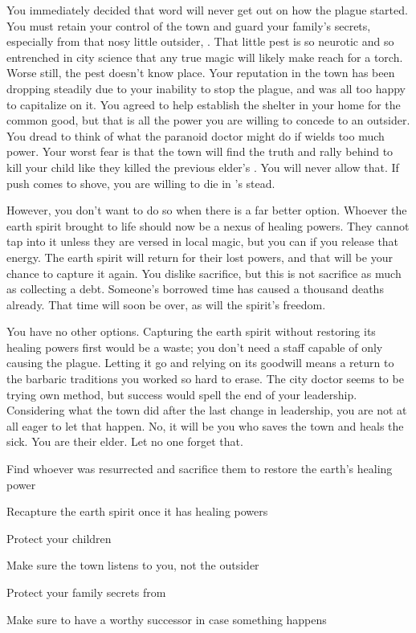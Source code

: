 \documentclass[char]{guildcamp4}
\begin{document}
You immediately decided that word will never get out on how the plague started. You must retain your control of the town and guard your family's secrets, especially from that nosy little outsider, \cOutsider{}. That little pest is so neurotic and so entrenched in \cOutsider{\their} city science that any true magic will likely make \cOutsider{\them} reach for a torch. Worse still, the pest doesn't know \cOutsider{\their} place. Your reputation in the town has been dropping steadily due to your inability to stop the plague, and \cOutsider{} was all too happy to capitalize on it. You agreed to help \cOutsider{\them} establish the shelter in your home for the common good, but that is all the power you are willing to concede to an outsider. You dread to think of what the paranoid doctor might do if \cOutsider{\they} wields too much power. Your worst fear is that the town will find the truth and rally behind \cOutsider{\them} to kill your child like they killed the previous elder's \cPlaguebearer{\offspring}. You will never allow that. If push comes to shove, you are willing to die in \cRebel{}'s stead. 

However, you don't want to do so when there is a far better option. Whoever the earth spirit brought to life should now be a nexus of healing powers. They cannot tap into it unless they are versed in local magic, but you can if you release that energy. The earth spirit will return for their lost powers, and that will be your chance to capture it again. You dislike sacrifice, but this is not sacrifice as much as collecting a debt. Someone's borrowed time has caused a thousand deaths already. That time will soon be over, as will the spirit's freedom. 

You have no other options. Capturing the earth spirit without restoring its healing powers first would be a waste; you don't need a staff capable of only causing the plague. Letting it go and relying on its goodwill means a return to the barbaric traditions you worked so hard to erase. The city doctor seems to be trying \cOutsider{\their} own method, but \cOutsider{\their} success would spell the end of your leadership. Considering what the town did after the last change in leadership, you are not at all eager to let that happen. No, it will be you who saves the town and heals the sick. You are their elder. Let no one forget that.

\begin{itemz}[Goals]
	\item Find whoever was resurrected and sacrifice them to restore the earth's healing power
	\item Recapture the earth spirit once it has healing powers
	\item Protect your children
	\item Make sure the town listens to you, not the outsider
	\item Protect your family secrets from \cOutsider{}
	\item Make sure to have a worthy successor in case something happens
\end{itemz} 
\end{document}
